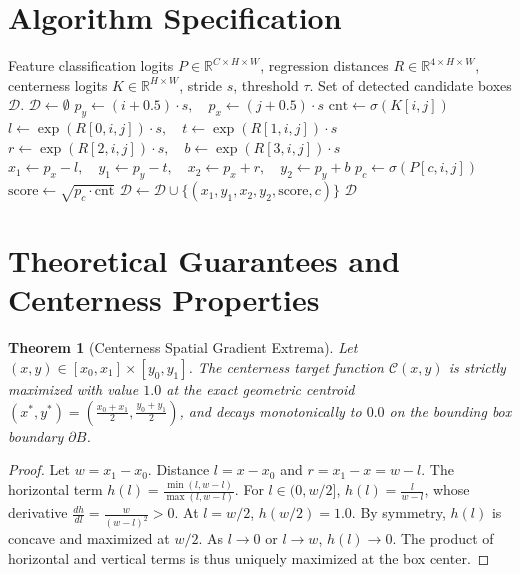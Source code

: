\documentclass[11pt,a4paper]{article}
\newtheorem{theorem}{Theorem}
\theoremstyle{definition}
\begin{document}
\section{Algorithm Specification}

\begin{algorithm}[H]
\caption{FCOS Dense Feature Decoding}
\label{alg:fcos}
\begin{algorithmic}[1]
\Require Feature classification logits $P \in \mathbb{R}^{C \times H \times W}$, regression distances $R \in \mathbb{R}^{4 \times H \times W}$, centerness logits $K \in \mathbb{R}^{H \times W}$, stride $s$, threshold $\tau$.
\Ensure Set of detected candidate boxes $\mathcal{D}$.
\State $\mathcal{D} \gets \emptyset$
        \State $p_y \gets (i + 0.5) \cdot s, \quad p_x \gets (j + 0.5) \cdot s$
        \State $\text{cnt} \gets \sigma(K[i, j])$
        \State $l \gets \exp(R[0, i, j]) \cdot s, \quad t \gets \exp(R[1, i, j]) \cdot s$
        \State $r \gets \exp(R[2, i, j]) \cdot s, \quad b \gets \exp(R[3, i, j]) \cdot s$
        \State $x_1 \gets p_x - l, \quad y_1 \gets p_y - t, \quad x_2 \gets p_x + r, \quad y_2 \gets p_y + b$
            \State $p_c \gets \sigma(P[c, i, j])$
            \State $\text{score} \gets \sqrt{p_c \cdot \text{cnt}}$
                \State $\mathcal{D} \gets \mathcal{D} \cup \{(x_1, y_1, x_2, y_2, \text{score}, c)\}$
            \EndIf
        \EndFor
    \EndFor
\EndFor
\State \Return $\mathcal{D}$
\end{algorithmic}
\end{algorithm}

\section{Theoretical Guarantees and Centerness Properties}

\begin{theorem}[Centerness Spatial Gradient Extrema]
\label{thm:centerness}
Let $(x, y) \in [x_0, x_1] \times [y_0, y_1]$. The centerness target function $\mathcal{C}(x, y)$ is strictly maximized with value $1.0$ at the exact geometric centroid $(x^*, y^*) = \left(\frac{x_0+x_1}{2}, \frac{y_0+y_1}{2}\right)$, and decays monotonically to $0.0$ on the bounding box boundary $\partial B$.
\end{theorem}

\begin{proof}
Let $w = x_1 - x_0$. Distance $l = x - x_0$ and $r = x_1 - x = w - l$. The horizontal term $h(l) = \frac{\min(l, w-l)}{\max(l, w-l)}$. For $l \in (0, w/2]$, $h(l) = \frac{l}{w-l}$, whose derivative $\frac{d h}{d l} = \frac{w}{(w-l)^2} > 0$. At $l = w/2$, $h(w/2) = 1.0$. By symmetry, $h(l)$ is concave and maximized at $w/2$. As $l \to 0$ or $l \to w$, $h(l) \to 0$. The product of horizontal and vertical terms is thus uniquely maximized at the box center.
\end{proof}
\end{document}
